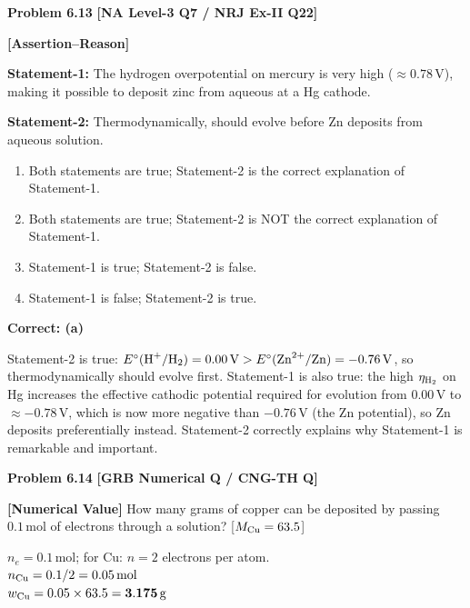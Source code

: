 \begin{problembox}
\textbf{Problem 6.13} \hfill \textbf{[NA Level-3 Q7 / NRJ Ex-II Q22]}

\textbf{[Assertion--Reason]}

\textbf{Statement-1:} The hydrogen overpotential on mercury is very high ($\approx 0.78\,\text{V}$), making it possible to deposit zinc from aqueous  at a Hg cathode.

\textbf{Statement-2:} Thermodynamically,  should evolve before Zn deposits from aqueous solution.

\begin{enumerate}[label=(\alph*)]
    \item Both statements are true; Statement-2 is the correct explanation of Statement-1.
    \item Both statements are true; Statement-2 is NOT the correct explanation of Statement-1.
    \item Statement-1 is true; Statement-2 is false.
    \item Statement-1 is false; Statement-2 is true.
\end{enumerate}
\end{problembox}
\begin{solution}
\textbf{Correct: (a)}

Statement-2 is true: $E^\circ(\ce{H+/H2}) = 0.00\,\text{V} > E^\circ(\ce{Zn^2+/Zn}) = -0.76\,\text{V}$, so thermodynamically  should evolve first. Statement-1 is also true: the high $\eta_{\ce{H2}}$ on Hg increases the effective cathodic potential required for  evolution from $0.00\,\text{V}$ to $\approx -0.78\,\text{V}$, which is now more negative than $-0.76\,\text{V}$ (the Zn potential), so Zn deposits preferentially instead. Statement-2 correctly explains why Statement-1 is remarkable and important.
\end{solution}

\begin{problembox}
\textbf{Problem 6.14} \hfill \textbf{[GRB Numerical Q / CNG-TH Q]}

\textbf{[Numerical Value]} How many grams of copper can be deposited by passing $0.1\,\text{mol}$ of electrons through a  solution? [$M_{\ce{Cu}} = 63.5$]
\end{problembox}
\begin{solution}
$n_e = 0.1\,\text{mol}$; for Cu: $n = 2$ electrons per atom.\\
$n_{\ce{Cu}} = 0.1/2 = 0.05\,\text{mol}$\\
$w_{\ce{Cu}} = 0.05 \times 63.5 = \mathbf{3.175\,\text{g}}$
\end{solution}

